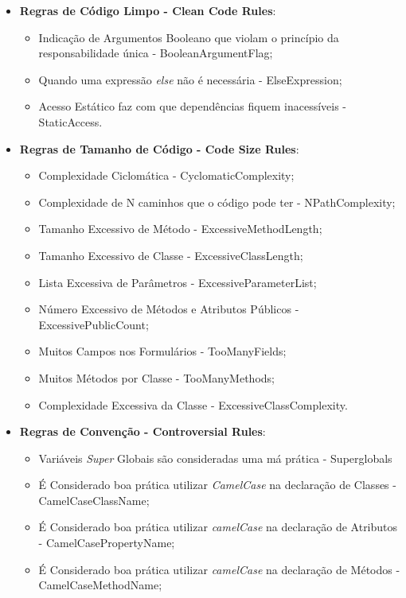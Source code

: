 \begin{itemize}
  \item \textbf{Regras de Código Limpo - Clean Code Rules}:
		\begin{itemize}
			\item Indicação de Argumentos Booleano que violam o princípio da
						responsabilidade única - BooleanArgumentFlag;
			\item Quando uma expressão \textit{else} não é necessária - ElseExpression;
			\item Acesso Estático faz com que dependências fiquem inacessíveis - StaticAccess.
		\end{itemize}
  \item \textbf{Regras de Tamanho de Código - Code Size Rules}:
		\begin{itemize}
			\item Complexidade Ciclomática - CyclomaticComplexity;
			\item Complexidade de N caminhos que o código pode ter - NPathComplexity;
			\item Tamanho Excessivo de Método - ExcessiveMethodLength;
			\item Tamanho Excessivo de Classe - ExcessiveClassLength;
			\item Lista Excessiva de Parâmetros - ExcessiveParameterList;
			\item Número Excessivo de Métodos e Atributos Públicos - ExcessivePublicCount;
			\item Muitos Campos nos Formulários - TooManyFields;
			\item Muitos Métodos por Classe - TooManyMethods;
			\item Complexidade Excessiva da Classe - ExcessiveClassComplexity.
		\end{itemize}
  \item \textbf{Regras de Convenção - Controversial Rules}:
		\begin{itemize}
			\item Variáveis \textit{Super} Globais são consideradas uma má prática  -
            Superglobals
			\item É Considerado boa prática utilizar \textit{CamelCase} na declaração
            de Classes - CamelCaseClassName;
			\item É Considerado boa prática utilizar \textit{camelCase} na declaração
            de Atributos - CamelCasePropertyName;
			\item É Considerado boa prática utilizar \textit{camelCase} na declaração
            de Métodos - CamelCaseMethodName;

\end{itemize}
\end{itemize}
